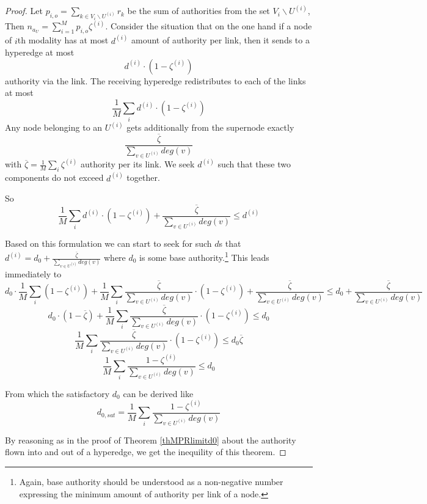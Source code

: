 \documentclass{fundam}
\newcommand{\N}{ V }
\begin{document}
\begin{proof}
Let  $p_{i,o}=\sum_{k \in \N_i \backslash U^{(i)}}r_k$ be the sum of authorities from the set $\N_i \backslash U^{(i)}$,
Then $n_{a_U}=\sum_{i=1}^M p_{i,o}\zeta^{(i)}$.
Consider   the situation
that
on the one hand if a node of $i$th modality   has at most $d^{(i)}$ amount of authority per link, then it sends to a hyperedge
at most $$d^{(i)}{\cdot}(1-\zeta^{(i)})$$ authority via the link.
The receiving hyperedge redistributes
to each of  the  links at most $$\frac1M\sum_id^{(i)}{\cdot}(1-\zeta^{(i)})$$
Any node belonging to an $U^{(i)}$  gets additionally from the supernode exactly
$$\frac{\overline{\zeta} }{\sum_{v \in U^{(i)}}deg(v)}$$
with $\overline{\zeta}=\frac1M\sum_i \zeta^{(i)}$
authority per its link.
We seek   $d^{(i)}$ such that these two components do not exceed $d^{(i)}$ together.

So
$$ \frac1M\sum_id^{(i)}{\cdot}(1-\zeta^{(i)})
 +
 \frac{\overline{\zeta}  }{\sum_{v \in U^{(i)}}deg(v)}  \le d^{(i)} $$


Based on this formulation we can start to seek for such $d$s that
$d^{(i)}=d_0+ \frac{\overline{\zeta}  }{\sum_{v \in U^{(i)}}deg(v)}  $
where $d_0$ is some base authority.\footnote{Again, base authority should be understood as a non-negative number expressing the minimum amount of authority per link of a node.}
This leads immediately to
$$ d_0\cdot \frac1M\sum_i(1-\zeta^{(i)})+ \frac1M\sum_i\frac{\overline{\zeta}  }{\sum_{v \in U^{(i)}}deg(v)}{\cdot}(1-\zeta^{(i)})
 +
 \frac{\overline{\zeta} }{\sum_{v \in U^{(i)}}deg(v)}  \le
d_0+ \frac{\overline{\zeta}  }{\sum_{v \in U^{(i)}}deg(v)}
 $$
$$ d_0\cdot  (1-\overline{\zeta} )+ \frac1M\sum_i\frac{\overline{\zeta}  }{\sum_{v \in U^{(i)}}deg(v)}{\cdot}(1-\zeta^{(i)})
   \le
d_0
 $$
$$   \frac1M\sum_i\frac{\overline{\zeta}  }{\sum_{v \in U^{(i)}}deg(v)}{\cdot}(1-\zeta^{(i)})
   \le
d_0 \overline{\zeta}
 $$
$$   \frac1M\sum_i\frac{ 1-\zeta^{(i)}    }{\sum_{v \in U^{(i)}}deg(v)}
   \le
d_0
 $$

From which the   satisfactory $d_0$ can be derived
like
$$d_{0,sat}=   \frac1M\sum_i\frac{ 1-\zeta^{(i)}    }{\sum_{v \in U^{(i)}}deg(v)}
 $$

By reasoning as in the proof of Theorem \ref{thMPRlimitd0} about the authority flown into and out of a hyperedge, we get the inequility of this theorem.
\end{proof}
\end{document}
